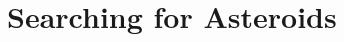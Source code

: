\documentclass[11pt]{gsasthesis} %
\begin{document}
% 

% 

% 

\chapter{Searching for Asteroids}\label{ch:4}


% 

% 



\begin{singlespacing}
\renewcommand{\bibname}{References}

% 
% 

\end{singlespacing}

% 
\end{document}
